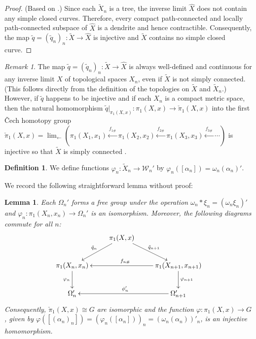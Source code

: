 \documentclass{amsart}
\newtheorem{lemma}[theorem]{Lemma}
\theoremstyle{definition}
\newtheorem{definition}[theorem]{Definition}
\theoremstyle{remark}
\newtheorem{remark}[theorem]{Remark}
\numberwithin{equation}{section}
\begin{document}
\begin{proof}(Based on \cite{CF1}.)
Since each $\tilde{X}_n$ is a tree, the inverse limit $\hat{X}$ does not contain any simple closed curves. Therefore, every compact path-connected and locally path-connected subspace of $\hat{X}$ is a dendrite and hence contractible. Consequently, the map $\displaystyle\tilde{q}=(\tilde{q}_n)_n:\tilde{X}\rightarrow \hat{X}$ is injective and $\tilde{X}$ contains no simple closed curve.
\end{proof}

\begin{remark}\label{simply}
The map  $\displaystyle\tilde{q}=(\tilde{q}_n)_n:\tilde{X}\rightarrow \hat{X}$ is always well-defined and continuous for any inverse limit $X$ of topological spaces $X_n$, even if $\tilde{X}$ is not simply connected. (This follows directly from the definition of the topologies on $\tilde{X}$ and $\tilde{X}_n$.) However,  if $\tilde{q}$ happens to be injective and if each $X_n$ is a compact metric space, then the natural homomorphism   $\tilde{q}|_{\pi_1(X,x)}:\pi_1(X,x)\rightarrow \check{\pi}_1(X,x)$ into the first \v{C}ech \linebreak homotopy group $\displaystyle \check{\pi}_1(X,x)=\lim_{\longleftarrow} \left( \pi_1(X_1,x_1) \stackrel{f_{1\#}}{\leftarrow}\pi_1(X_2,x_2) \stackrel{f_{2\#}}{\leftarrow}\pi_1(X_3,x_3) \stackrel{f_{3\#}}{\leftarrow}\cdots\right)$  is injective so that $\tilde{X}$ is simply connected \cite{FZ2}.
\end{remark}

\begin{definition} \label{phidef}
We define functions $\varphi_n:\tilde{X}_n\rightarrow {\mathcal W}_n'$ by $\varphi_n([\alpha_n])=\omega_n(\alpha_n)'$.
\end{definition}

We record the following straightforward lemma without proof:

  \begin{lemma} \label{cech} Each $\Omega_n'$ forms a free group under the operation $\omega_n\ast\xi_n=(\omega_n\xi_n)'$ and $\varphi_n:\pi_1(X_n,x_n)\rightarrow \Omega_n'$  is an isomorphism. Moreover, the following diagrams commute for all $n$:
\[\xymatrix{ & \pi_1(X,x) \ar[ld]_{\tilde{q}_n} \ar[rd]^{\tilde{q}_{n+1}} & \\ \pi_1(X_n,x_n)\ar[d]_{\varphi_n} & & \pi_1(X_{n+1},x_{n+1}) \ar[ll]_{f_{n\#}} \ar[d]^{\varphi_{n+1} }\\
\Omega_n' &  & \Omega_{n+1}'\ar[ll]_{\phi'_n } }\]
Consequently,  $\check{\pi}_1(X,x)\cong G$ are isomorphic and the function $\varphi:\pi_1(X,x)\rightarrow  G$, given by $\varphi([(\alpha_n)_n])=(\varphi_n([\alpha_n]))_n=(\omega_n(\alpha_n))'_n$,
 is an injective homomorphism.
\end{lemma}
\end{document}

